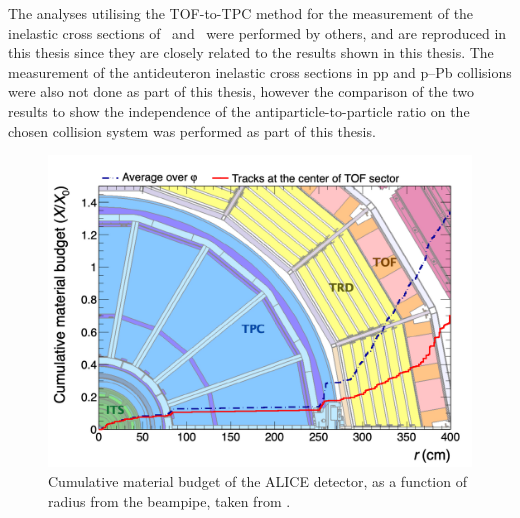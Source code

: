 The analyses utilising the TOF-to-TPC method for the measurement of the inelastic cross sections of \ahe\ and \atrit\ were performed by others, and are reproduced in this thesis since they are closely related to the results shown in this thesis. The measurement of the antideuteron inelastic cross sections in pp and p--Pb collisions were also not done as part of this thesis, however the comparison of the two results to show the independence of the antiparticle-to-particle ratio on the chosen collision system was performed as part of this thesis. 

\begin{figure}
		\centering
		\includegraphics[width=\textwidth]{figures/alice-material_0.png}
		\caption{Cumulative material budget of the ALICE detector, as a function of radius from the beampipe, taken from \cite{antideuteronXS}.}
		\label{fig:ALICE_detector_material_budget}
\end{figure}    

